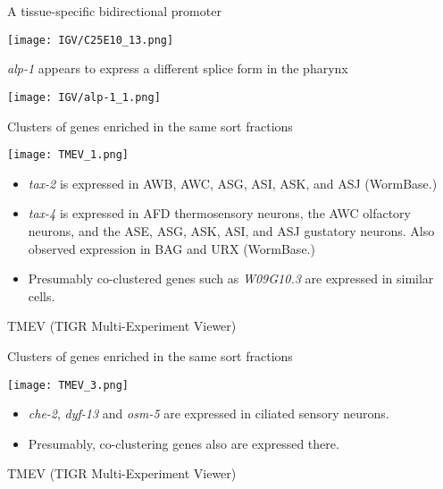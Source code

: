 \documentclass[serif,9pt]{beamer}
\begin{document}
\begin{frame}{A tissue-specific bidirectional promoter}

\texttt{[image: IGV/C25E10\_13.png]}

\end{frame}

\begin{frame}{{\em alp-1} appears to express a different splice form in the pharynx}
\begin{center}
\texttt{[image: IGV/alp-1\_1.png]}
\end{center} 
\end{frame}

\begin{frame}{Clusters of genes enriched in the same sort fractions}
\begin{minipage}{0.5\textwidth}
\texttt{[image: TMEV\_1.png]}
\end{minipage}
\begin{minipage}{0.48\textwidth}
{\small 
\begin{itemize}

\item {\em tax-2} is expressed in AWB, AWC, ASG, ASI, ASK, and ASJ (WormBase.)

\item {\em tax-4} is expressed in AFD thermosensory neurons, the AWC olfactory neurons, and the ASE, ASG, ASK, ASI, and ASJ gustatory neurons. Also observed expression in BAG and URX (WormBase.)

\item Presumably co-clustered genes such as {\em W09G10.3} are expressed
in similar cells.

\end{itemize}
}
\end{minipage}
\vspace{5mm}

\hfill TMEV (TIGR Multi-Experiment Viewer)
\end{frame}

\begin{frame}{Clusters of genes enriched in the same sort fractions}

\begin{minipage}{0.45\textwidth}
\texttt{[image: TMEV\_3.png]}
\end{minipage}
\begin{minipage}{0.48\textwidth}
\begin{itemize}

\item {\em che-2}, {\em dyf-13} and {\em osm-5} are expressed in ciliated
sensory neurons.

\item Presumably, co-clustering genes also are expressed there.
\end{itemize}

\end{minipage}

\hfill TMEV (TIGR Multi-Experiment Viewer)
\end{frame}
\end{document}
